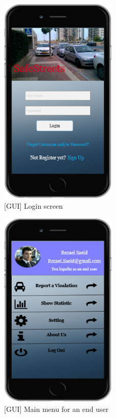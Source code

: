  \begin{figure}[H]
		\centering
      \includegraphics[width=0.5\textwidth]{GUI/UserLogin.png}
      \caption{[GUI] Login screen}   \label{fig:UserLogin}
\end{figure}

\begin{figure}[H]
		\centering
      \includegraphics[width=0.5\textwidth]{GUI/MainMenuEndUser.png}
      \caption{[GUI] Main menu for an end user}   \label{fig:MainMenuEndUser}
\end{figure}

